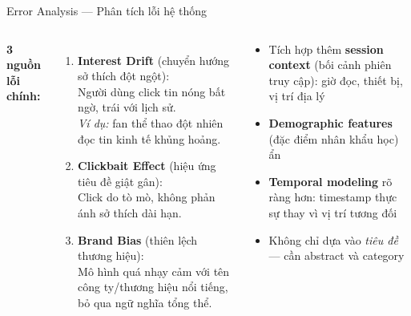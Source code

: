 \documentclass[aspectratio=169,11pt]{beamer}
\begin{document}
\begin{frame}{Error Analysis --- Phân tích lỗi hệ thống}
  \begin{columns}[T]
      \textbf{3 nguồn lỗi chính:}
      \begin{enumerate}
        \item \textbf{Interest Drift} (chuyển hướng sở thích đột ngột):\\
          Người dùng click tin nóng bất ngờ, trái với lịch sử.\\
          \textit{Ví dụ:} fan thể thao đột nhiên đọc tin kinh tế khủng hoảng.

        \vspace{0.3em}
        \item \textbf{Clickbait Effect} (hiệu ứng tiêu đề giật gân):\\
          Click do tò mò, không phản ánh sở thích dài hạn.

        \vspace{0.3em}
        \item \textbf{Brand Bias} (thiên lệch thương hiệu):\\
          Mô hình quá nhạy cảm với tên công ty/thương hiệu
          nổi tiếng, bỏ qua ngữ nghĩa tổng thể.
      \end{enumerate}

      \begin{warnbox}[title={Hướng khắc phục}]
        \begin{itemize}
          \item Tích hợp thêm \textbf{session context}
            (bối cảnh phiên truy cập):
            giờ đọc, thiết bị, vị trí địa lý
          \item \textbf{Demographic features}
            (đặc điểm nhân khẩu học) ẩn
          \item \textbf{Temporal modeling} rõ ràng hơn:
            timestamp thực sự thay vì vị trí tương đối
          \item Không chỉ dựa vào \textit{tiêu đề} ---
            cần abstract và category
        \end{itemize}
      \end{warnbox}
  \end{columns}
\end{frame}
\end{document}
